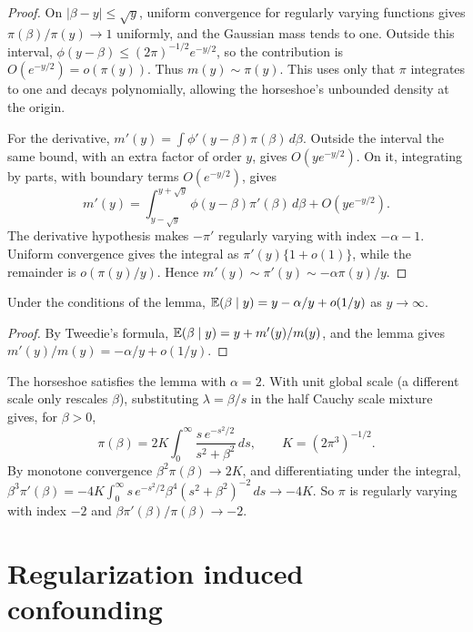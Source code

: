 \begin{proof}
On $|\beta-y|\le\sqrt y$, uniform convergence for regularly varying functions gives $\pi(\beta)/\pi(y)\to1$ uniformly, and the Gaussian mass tends to one. Outside this interval, $\phi(y-\beta)\le(2\pi)^{-1/2}e^{-y/2}$, so the contribution is $O(e^{-y/2})=o(\pi(y))$. Thus $m(y)\sim\pi(y)$. This uses only that $\pi$ integrates to one and decays polynomially, allowing the horseshoe's unbounded density at the origin.

For the derivative, $m'(y)=\int\phi'(y-\beta)\pi(\beta)\,d\beta$. Outside the interval the same bound, with an extra factor of order $y$, gives $O(ye^{-y/2})$. On it, integrating by parts, with boundary terms $O(e^{-y/2})$, gives
\[
m'(y)=\int_{y-\sqrt y}^{y+\sqrt y}\phi(y-\beta)\pi'(\beta)\,d\beta+O(ye^{-y/2}).
\]
The derivative hypothesis makes $-\pi'$ regularly varying with index $-\alpha-1$. Uniform convergence gives the integral as $\pi'(y)\{1+o(1)\}$, while the remainder is $o(\pi(y)/y)$. Hence $m'(y)\sim\pi'(y)\sim-\alpha\pi(y)/y$.
\end{proof}

\begin{theorem}
Under the conditions of the lemma, $\mathbb{E}(\beta \mid y) = y - \alpha/y + o(1/y)$ as $y \to \infty$.
\end{theorem}

\begin{proof}
By Tweedie's formula, $\mathbb{E}(\beta \mid y) = y + m'(y)/m(y)$, and the lemma gives $m'(y)/m(y) = -\alpha/y + o(1/y)$.
\end{proof}

The horseshoe satisfies the lemma with $\alpha = 2$. With unit global scale (a different scale only rescales $\beta$), substituting $\lambda = \beta/s$ in the half Cauchy scale mixture gives, for $\beta > 0$,
\[
\pi(\beta) = 2K\int_0^\infty \frac{s\,e^{-s^2/2}}{s^2 + \beta^2}\,ds, \qquad K = (2\pi^3)^{-1/2}.
\]
By monotone convergence $\beta^2\pi(\beta) \to 2K$, and differentiating under the integral, $\beta^3\pi'(\beta) = -4K\int_0^\infty s\,e^{-s^2/2}\beta^4(s^2 + \beta^2)^{-2}\,ds \to -4K$. So $\pi$ is regularly varying with index $-2$ and $\beta\pi'(\beta)/\pi(\beta) \to -2$. 

\section{Regularization induced confounding}


